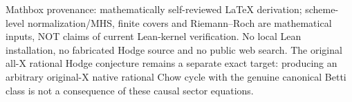 \documentclass[11pt]{article}
\begin{document}
Mathbox provenance: mathematically self-reviewed LaTeX derivation; scheme-level normalization/MHS, finite covers and Riemann--Roch are mathematical inputs, NOT claims of current Lean-kernel verification. No local Lean installation, no fabricated Hodge source and no public web search. The original all-X rational Hodge conjecture remains a separate exact target: producing an arbitrary original-X native rational Chow cycle with the genuine canonical Betti class is not a consequence of these causal sector equations.
\end{document}
